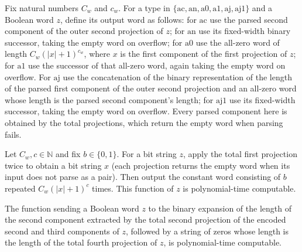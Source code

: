 \begin{definition}
\label{Complexity.Meyer.awd}
\leanok
{}
Fix natural numbers $C_w$ and $c_w$. For a type in
$\{\mathrm{ac},\mathrm{an},\mathrm{a0},\mathrm{a1},\mathrm{aj},\mathrm{aj1}\}$ and a
Boolean word $z$, define its output word as follows: for $\mathrm{ac}$ use the parsed
second component of the outer second projection of $z$; for $\mathrm{an}$ use its
fixed-width binary successor, taking the empty word on overflow; for $\mathrm{a0}$ use
the all-zero word of length $C_w(|x|+1)^{c_w}$, where $x$ is the first component of the
first projection of $z$; for $\mathrm{a1}$ use the successor of that all-zero word,
again taking the empty word on overflow. For $\mathrm{aj}$ use the concatenation of the
binary representation of the length of the parsed first component of the outer second
projection and an all-zero word whose length is the parsed second component's length;
for $\mathrm{aj1}$ use its fixed-width successor, taking the empty word on overflow.
Every parsed component here is obtained by the total projections, which return the empty
word when parsing fails.
\end{definition}

\begin{theorem}
\label{Complexity.Meyer.pt_rep}
\leanok
{}
Let $C_w,c\in\mathbb{N}$ and fix $b\in\{0,1\}$. For a bit string $z$, apply the total
first projection twice to obtain a bit string $x$ (each projection returns the empty
word when its input does not parse as a pair). Then output the constant word consisting
of $b$ repeated $C_w(|x|+1)^c$ times. This function of $z$ is polynomial-time
computable.
\end{theorem}

\begin{theorem}
\label{Complexity.Meyer.pt_bjw}
\leanok
{}
The function sending a Boolean word $z$ to the binary expansion of the length of the
second component extracted by the total second projection of the encoded second and
third components of $z$, followed by a string of zeros whose length is the length of the
total fourth projection of $z$, is polynomial-time computable.
\end{theorem}

